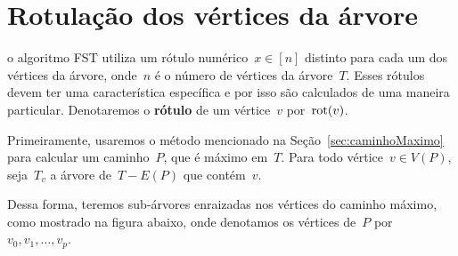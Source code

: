 \section {Rotulação dos vértices da árvore}
\label{sec:rotulacao}

	o algoritmo FST utiliza um 
	rótulo numérico~$x\in [n]$ distinto para cada um dos vértices 
	da árvore, onde~$n$ é o número de vértices da árvore~$T$. 
	Esses rótulos devem ter uma característica específica e por isso
	são calculados de uma maneira particular.
	Denotaremos o \textbf{rótulo} de um vértice~$v$ por~$\mathrm{rot}(v)$.

	Primeiramente, usaremos o método mencionado na 
	Seção~\ref{sec:caminhoMaximo} para calcular 
	um caminho~$P$, que é máximo em~$T$. 
	Para todo vértice~$v\in V(P)$, 
	seja~$T_v$ a árvore de~$T-E(P)$ que contém~$v$.

	Dessa forma, teremos sub-árvores enraizadas nos vértices do
	caminho máximo, como mostrado na figura abaixo, onde denotamos
	os vértices de~$P$ por~${v_0,v_1,\ldots,v_p}$.
	

